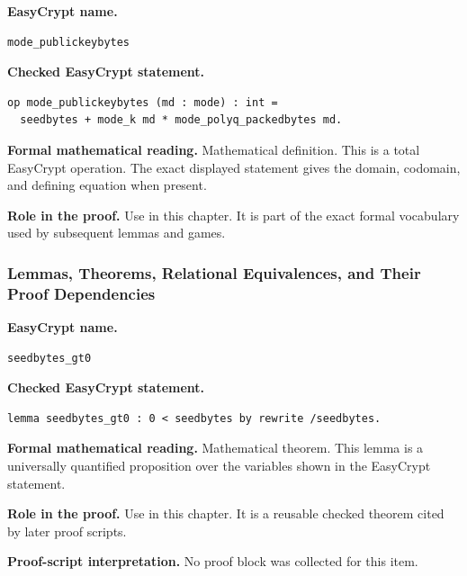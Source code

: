 \begin{formaldefinition}
\noindent\textbf{EasyCrypt name.}
\begin{lstlisting}[language=EasyCrypt,basicstyle=\ttfamily\scriptsize]
mode_publickeybytes
\end{lstlisting}
\noindent\textbf{Checked EasyCrypt statement.}
\begin{lstlisting}[language=EasyCrypt,basicstyle=\ttfamily\scriptsize]
op mode_publickeybytes (md : mode) : int =
  seedbytes + mode_k md * mode_polyq_packedbytes md.
\end{lstlisting}
\noindent\textbf{Formal mathematical reading.}
Mathematical definition. This is a total EasyCrypt operation.  The exact displayed statement gives the domain, codomain, and defining equation when present.

\noindent\textbf{Role in the proof.}
Use in this chapter. It is part of the exact formal vocabulary used by subsequent lemmas and games.

\end{formaldefinition}

\subsubsection*{Lemmas, Theorems, Relational Equivalences, and Their Proof Dependencies}
\begin{formaltheorem}
\noindent\textbf{EasyCrypt name.}
\begin{lstlisting}[language=EasyCrypt,basicstyle=\ttfamily\scriptsize]
seedbytes_gt0
\end{lstlisting}
\noindent\textbf{Checked EasyCrypt statement.}
\begin{lstlisting}[language=EasyCrypt,basicstyle=\ttfamily\scriptsize]
lemma seedbytes_gt0 : 0 < seedbytes by rewrite /seedbytes.
\end{lstlisting}
\noindent\textbf{Formal mathematical reading.}
Mathematical theorem. This lemma is a universally quantified proposition over the variables shown in the EasyCrypt statement.

\noindent\textbf{Role in the proof.}
Use in this chapter. It is a reusable checked theorem cited by later proof scripts.

\noindent\textbf{Proof-script interpretation.}
No proof block was collected for this item.

\end{formaltheorem}

